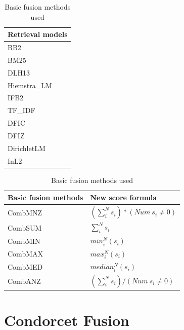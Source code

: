 	\begin{table} [H]
		\begin{minipage} {0.2\linewidth}
			\centering
			\begin{tabular}{l}
				\toprule
				\textbf{Retrieval models} \\ \toprule
				BB2 \\
				BM25 \\
				DLH13 \\
				Hiemstra\_LM \\
				IFB2 \\
				TF\_IDF \\
				DFIC \\
				DFIZ \\
				DirichletLM \\
				InL2 \\
				\bottomrule
			\end{tabular}
			\caption{Retrieval models used}
			\label{tab:10Mod}
		\end{minipage}		
		\begin{minipage} {0.8\linewidth}
			\centering
			{\def\arraystretch{2}\tabcolsep=10pt
			\begin{tabular}{l p{5cm}}
				\toprule
				\textbf{Basic fusion methods} & \textbf{New score formula} \\ \toprule
				CombMNZ & $(\sum_{i}^{N} s_{i})*(Num~s_{i}\ne 0)$ \\ \hline
				CombSUM & $ \sum_{i}^{N} s_{i} $ \\ \hline
				CombMIN & $ min_{i}^{N} {(s_{i})} $ \\ \hline
				CombMAX & $ max_{i}^{N} {(s_{i})} $  \\ \hline
				CombMED & $ median_{i}^{N} {(s_{i})} $ \\ \hline
				CombANZ & $  (\sum_{i}^{N} s_{i}) /
							(Num ~ s_{i} \ne 0)$   \\ 
							\bottomrule
			\end{tabular}}
			\caption{Basic fusion methods used }
			\label{tab:6Fus}
		\end{minipage}		
	\end{table}
    
  \section{Condorcet Fusion}

